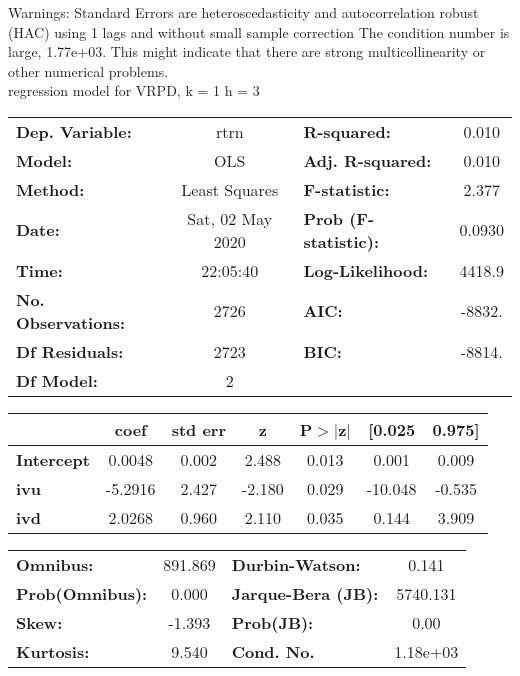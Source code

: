 Warnings: \newline
 [1] Standard Errors are heteroscedasticity and autocorrelation robust (HAC) using 1 lags and without small sample correction \newline
 [2] The condition number is large, 1.77e+03. This might indicate that there are \newline
 strong multicollinearity or other numerical problems.\\ 

regression model for VRPD, k = 1 h = 3\begin{center}
\begin{tabular}{lclc}
\toprule
\textbf{Dep. Variable:}    &       rtrn       & \textbf{  R-squared:         } &     0.010   \\
\textbf{Model:}            &       OLS        & \textbf{  Adj. R-squared:    } &     0.010   \\
\textbf{Method:}           &  Least Squares   & \textbf{  F-statistic:       } &     2.377   \\
\textbf{Date:}             & Sat, 02 May 2020 & \textbf{  Prob (F-statistic):} &   0.0930    \\
\textbf{Time:}             &     22:05:40     & \textbf{  Log-Likelihood:    } &    4418.9   \\
\textbf{No. Observations:} &        2726      & \textbf{  AIC:               } &    -8832.   \\
\textbf{Df Residuals:}     &        2723      & \textbf{  BIC:               } &    -8814.   \\
\textbf{Df Model:}         &           2      & \textbf{                     } &             \\
\bottomrule
\end{tabular}
\begin{tabular}{lcccccc}
                   & \textbf{coef} & \textbf{std err} & \textbf{z} & \textbf{P$> |$z$|$} & \textbf{[0.025} & \textbf{0.975]}  \\
\midrule
\textbf{Intercept} &       0.0048  &        0.002     &     2.488  &         0.013        &        0.001    &        0.009     \\
\textbf{ivu}       &      -5.2916  &        2.427     &    -2.180  &         0.029        &      -10.048    &       -0.535     \\
\textbf{ivd}       &       2.0268  &        0.960     &     2.110  &         0.035        &        0.144    &        3.909     \\
\bottomrule
\end{tabular}
\begin{tabular}{lclc}
\textbf{Omnibus:}       & 891.869 & \textbf{  Durbin-Watson:     } &    0.141  \\
\textbf{Prob(Omnibus):} &   0.000 & \textbf{  Jarque-Bera (JB):  } & 5740.131  \\
\textbf{Skew:}          &  -1.393 & \textbf{  Prob(JB):          } &     0.00  \\
\textbf{Kurtosis:}      &   9.540 & \textbf{  Cond. No.          } & 1.18e+03  \\
\bottomrule
\end{tabular}
\end{center}

